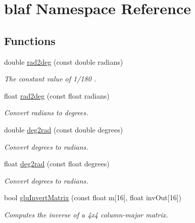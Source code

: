 \hypertarget{namespaceblaf}{\section{blaf \-Namespace \-Reference}
\label{namespaceblaf}
}
\subsection*{\-Functions}
\begin{DoxyCompactItemize}
\item 
double \hyperlink{namespaceblaf_a3d0a8e7bdb64e1451b5d6c267e895e0a}{rad2deg} (const double radians)
\begin{DoxyCompactList}\small\item\em \-The constant value of 1/180 . \end{DoxyCompactList}\item 
float \hyperlink{namespaceblaf_a909ca91bbd8e85b55b12ad57a1d2bc92}{rad2deg} (const float radians)
\begin{DoxyCompactList}\small\item\em \-Convert radians to degrees. \end{DoxyCompactList}\item 
double \hyperlink{namespaceblaf_afc65e65ad15ba81dd610ec730e026a7d}{deg2rad} (const double degrees)
\begin{DoxyCompactList}\small\item\em \-Convert degrees to radians. \end{DoxyCompactList}\item 
float \hyperlink{namespaceblaf_a28c67e8ed18d1a3d75e4cb46168fd145}{deg2rad} (const float degrees)
\begin{DoxyCompactList}\small\item\em \-Convert degrees to radians. \end{DoxyCompactList}\item 
bool \hyperlink{namespaceblaf_a1d0fc91d98884a1c7cb36afeb462cde8}{glu\-Invert\-Matrix} (const float m\mbox{[}16\mbox{]}, float inv\-Out\mbox{[}16\mbox{]})
\begin{DoxyCompactList}\small\item\em \-Computes the inverse of a 4x4 column-\/major matrix. \end{DoxyCompactList}\end{DoxyCompactItemize}
